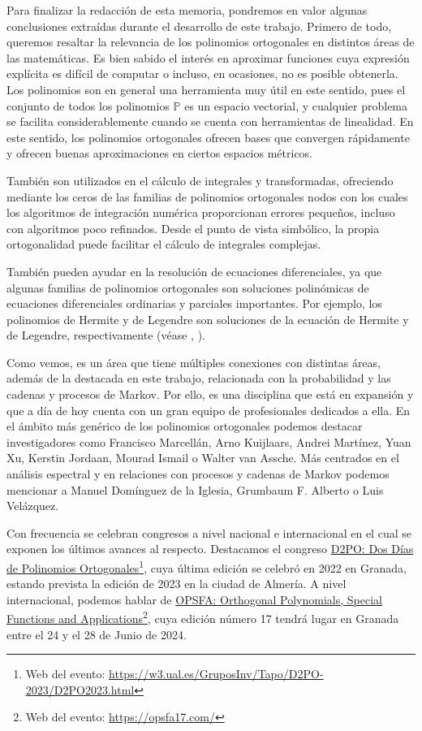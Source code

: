 %
%

Para finalizar la redacción de esta memoria, pondremos en valor algunas conclusiones extraídas durante el desarrollo de este trabajo. Primero de todo, queremos resaltar la relevancia de los polinomios ortogonales en distintos áreas de las matemáticas. Es bien sabido el interés en aproximar funciones cuya expresión explícita es difícil de computar o incluso, en ocasiones, no es posible obtenerla. Los polinomios son en general una herramienta muy útil en este sentido, pues el conjunto de todos los polinomios $\mathbb P$ es un espacio vectorial, y cualquier problema se facilita considerablemente cuando se cuenta con herramientas de linealidad. En este sentido, los polinomios ortogonales ofrecen bases que convergen rápidamente y ofrecen buenas aproximaciones en ciertos espacios métricos.

También son utilizados en el cálculo de integrales y transformadas, ofreciendo mediante los ceros de las familias de polinomios ortogonales nodos con los cuales los algoritmos de integración numérica proporcionan errores pequeños, incluso con algoritmos poco refinados. Desde el punto de vista simbólico, la propia ortogonalidad puede facilitar el cálculo de integrales complejas.

También pueden ayudar en la resolución de ecuaciones diferenciales, ya que algunas familias de polinomios ortogonales son soluciones polinómicas de ecuaciones diferenciales ordinarias y parciales importantes. Por ejemplo, los polinomios de Hermite y de Legendre son soluciones de la ecuación de Hermite y de Legendre, respectivamente (véase \cite{Hermite-ed}, \cite{Legendre-ed}).

Como vemos, es un área que tiene múltiples conexiones con distintas áreas, además de la destacada en este trabajo, relacionada con la probabilidad y las cadenas y procesos de Markov. Por ello, es una disciplina que está en expansión y que a día de hoy cuenta con un gran equipo de profesionales dedicados a ella. En el ámbito más genérico de los polinomios ortogonales podemos destacar investigadores como Francisco Marcellán, Arno Kuijlaars, Andrei Martínez, Yuan Xu, Kerstin Jordaan, Mourad Ismail o Walter van Assche. Más centrados en el análisis espectral y en relaciones con procesos y cadenas de Markov podemos mencionar a Manuel Domínguez de la Iglesia, Grumbaum F. Alberto o Luis Velázquez.

Con frecuencia se celebran congresos a nivel nacional e internacional en el cual se exponen los últimos avances al respecto. Destacamos el congreso \href{https://w3.ual.es/GruposInv/Tapo/D2PO-2023/D2PO2023.html}{D2PO: Dos Días de Polinomios Ortogonales}\footnote{Web del evento: \url{https://w3.ual.es/GruposInv/Tapo/D2PO-2023/D2PO2023.html}}, cuya última edición se celebró en 2022 en Granada, estando prevista la edición de 2023 en la ciudad de Almería. A nivel internacional, podemos hablar de \href{https://opsfa17.com/}{OPSFA: Orthogonal Polynomials, Special Functions and Applications}\footnote{Web del evento: \url{https://opsfa17.com/}}, cuya edición número 17 tendrá lugar en Granada entre el 24 y el 28 de Junio de 2024.

